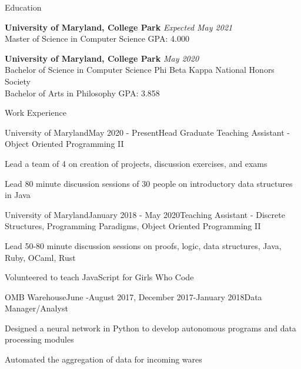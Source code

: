 \documentclass{resume} %
\begin{document}

\begin{rSection}{Education}

{\bf University of Maryland, College Park} \hfill {\em Expected May 2021} \\ 
Master of Science in  Computer Science \hfill {GPA: 4.000}

{\bf University of Maryland, College Park} \hfill {\em May 2020} \\ 
Bachelor of Science in  Computer Science \hfill {Phi Beta Kappa National Honors Society}\\
Bachelor of Arts in Philosophy \hfill {GPA: 3.858}

\end{rSection}


\begin{rSection}{Work Experience}

\begin{rSubsection}{University of Maryland}{May 2020 - Present}{Head Graduate Teaching Assistant - Object Oriented Programming II}{}
\item Lead a team of 4 on creation of projects, discussion exercises, and exams 
\item Lead 80 minute discussion sessions of 30 people on introductory data structures in Java
\end{rSubsection}

\begin{rSubsection}{University of Maryland}{January 2018 - May 2020}{Teaching Assistant - Discrete Structures, Programming Paradigms, Object Oriented Programming II}{}
\item Lead 50-80 minute discussion sessions on proofs, logic, data structures, Java, Ruby, OCaml, Rust
\item Volunteered to teach JavaScript for Girls Who Code
\end{rSubsection}

\begin{rSubsection}{OMB Warehouse}{June -August 2017, December 2017-January 2018}{Data Manager/Analyst}{}
\item Designed a neural network in Python to develop autonomous programs and data processing modules
\item Automated the aggregation of data for incoming wares
\end{rSubsection}

\end{rSection}
\end{document}
